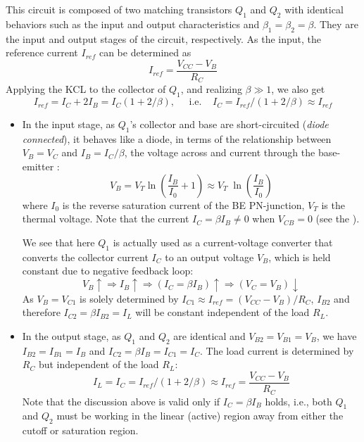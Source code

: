 \begin{itemize}
\begin{itemize}
  This circuit is composed of two matching transistors $Q_1$ and $Q_2$
  with identical behaviors such as the input and output characteristics
  and $\beta_1=\beta_2=\beta$. They are the input and output stages of
  the circuit, respectively. As the input, the reference current $I_{ref}$
  can be determined as
  \[
  I_{ref}=\frac{V_{CC}-V_B}{R_C}
  \]
  Applying the KCL to the collector of $Q_1$, and realizing $\beta\gg 1$,
  we also get
  \[
  I_{ref}=I_C+2I_B=I_C(1+2/\beta),\;\;\;\;\;\mbox{i.e.}\;\;\;\;
  I_C=I_{ref}/(1+2/\beta)\approx I_{ref}
  \]
  \begin{itemize}
  \item In the input stage, as $Q_1$'s collector and base are short-circuited
    ({\em diode connected}), it behaves like a diode, in terms of the 
    relationship between $V_B=V_C$ and $I_B=I_C/\beta$, the voltage across
    and current through the base-emitter 
    :
    \[
    V_B=V_T\ln \left(\frac{I_B}{I_0}+1\right)
    \approx V_T\;\ln \left(\frac{I_B}{I_0}\right)
    \]
    where $I_0$ is the reverse saturation current of the BE PN-junction,
    $V_T$ is the thermal voltage. Note that the current $I_C=\beta I_B\ne 0$
    when $V_{CB}=0$ (see the
    ).

    We see that here $Q_1$ is actually used as a current-voltage converter
    that converts the collector current $I_C$ to an output voltage $V_B$, 
    which is held constant due to negative feedback loop:
    \[
    V_B\uparrow \Longrightarrow I_B\uparrow \Longrightarrow 
    (I_C=\beta I_B) \uparrow \Longrightarrow (V_C=V_B)\downarrow
    \] 
    As $V_B=V_{C1}$ is solely determined by $I_{C1}\approx I_{ref}=(V_{CC}-V_B)/R_C$, 
    $I_{B2}$ and therefore $I_{C2}=\beta I_{B2}=I_L$ will be constant independent 
    of the load $R_L$.
    
  \item In the output stage, as $Q_1$ and $Q_2$ are identical and 
    $V_{B2}=V_{B1}=V_B$, we have $I_{B2}=I_{B1}=I_B$ and $I_{C2}=\beta I_B=I_{C1}=I_C$. 
    The load current is determined by $R_C$ but independent of the load $R_L$:
    \[
    I_L=I_C=I_{ref}/(1+2/\beta) \approx I_{ref}
    =\frac{V_{CC}-V_B}{R_C}
    \]
    Note that the discussion above is valid only if $I_C=\beta I_B$ holds,
    i.e., both $Q_1$ and $Q_2$ must be working in the linear (active) region 
    away from either the cutoff or saturation region.
  \end{itemize}


\end{itemize}
\end{itemize}
